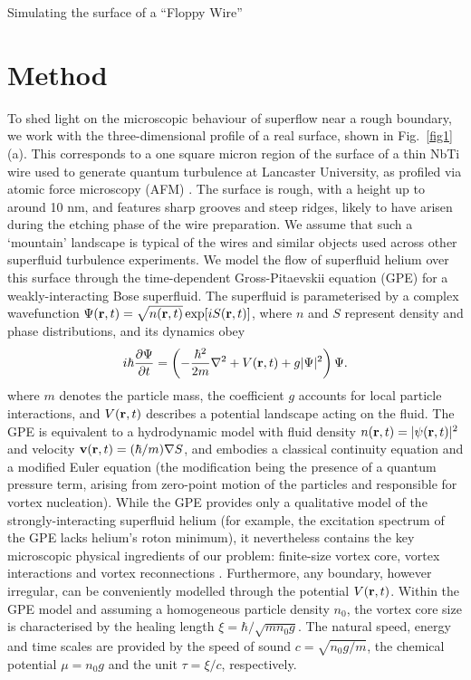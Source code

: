 \begin{chapter}{\label{cha:afm}Simulating the surface of a ``Floppy Wire''}
\section{Method}
To shed light on the microscopic behaviour of superflow near a rough
boundary, we work with the three-dimensional profile of a real surface, shown in Fig.~\ref{fig1}(a).  This corresponds to a one square micron region of the surface of a thin NbTi wire used to generate quantum turbulence at Lancaster University, as profiled via atomic force microscopy (AFM) \cite{Lawson}.  The surface is rough, with a height up to around 10 nm, and features sharp grooves and steep ridges, likely to have arisen during the etching phase of the wire preparation.    We assume that such a `mountain'  landscape is typical of the wires and similar objects used across other superfluid turbulence experiments.  We model the flow of
superfluid helium over this surface through the time-dependent Gross-Pitaevskii equation \cite{RobertsBerloff-GPE} (GPE) for a weakly-interacting Bose superfluid.  The superfluid is parameterised by a complex wavefunction $\Psi({\bf r},t)=\sqrt{n({\bf r},t)}\exp[i S({\bf r},t)]$, where $n$ and $S$ represent density and phase distributions, and its dynamics obey
\begin{equation}
i \hbar \frac{\partial\Psi}{\partial t} 
= \left(-\frac{\hbar^2}{2m}\nabla^2 + V({\bf r},t) + g|\Psi|^2 \right) \Psi.
\label{eq:gpe}
\end{equation}
where $m$ denotes the particle mass, the coefficient $g$ accounts for local particle interactions, and $V({\bf r},t)$ describes a potential landscape acting on the fluid.  
The GPE is equivalent to a hydrodynamic model with fluid 
density $n({\bf r},t)=|\psi({\bf r},t)|^2$ and velocity 
${\bf v}({\bf r},t)=(\hbar/m)\nabla S$, and embodies a classical 
continuity equation and a modified Euler equation (the modification being 
the presence of a quantum pressure term, arising from zero-point motion 
of the particles {and responsible for vortex nucleation}).  
While the GPE provides only a qualitative model of the strongly-interacting superfluid helium (for example, the excitation spectrum of the GPE lacks helium's roton minimum), it nevertheless contains the key microscopic physical ingredients of our problem: finite-size vortex core, vortex interactions and vortex reconnections \cite{RobertsBerloff-GPE}.  Furthermore, any boundary, however irregular, can be conveniently
modelled through the potential $V({\bf r},t)$.  Within the GPE model and assuming a homogeneous particle density $n_0$, the vortex core size is characterised by the healing length $\xi=\hbar/\sqrt{m n_0 g}$.  The natural speed, energy and time scales are provided by the speed of sound $c=\sqrt{n_0 g/m}$, the chemical potential $\mu=n_0 g$ and the unit $\tau=\xi/c$, respectively.  


\end{chapter}
